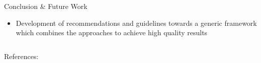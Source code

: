 \documentclass[final,hyperref={pdfpagelabels=true}]{beamer}
\begin{document}
\begin{frame}
\begin{columns}[t, onlytextwidth]
\begin{column}{\textwidth}
\begin{columns}[t, onlytextwidth]
\begin{column}{\textwidth}
\begin{block}{Conclusion \& Future Work}
\begin{minipage}[t][.09\textheight][c]{0.97\textwidth}
\begin{multicols}{2}
\begin{itemize}
								\item Development of recommendations and guidelines towards a generic framework which combines the approaches to achieve high quality results
							\end{itemize}
						\end{multicols}
					\end{minipage}
					\hfill
					\hbox{}
				\end{block}
			\end{column}
		\end{columns}
		
			
		
		\begin{columns}[t, onlytextwidth]
			\begin{column}{\textwidth}
				\scriptsize
				
				References:
				
				\vspace{-1cm}
				\setlength{\columnsep}{-10cm}
				\begin{multicols}{2}
					
					
				\end{multicols}
			\end{column}
		\end{columns}
		
    \end{column}

  \end{columns}
\end{frame}
\end{document}
